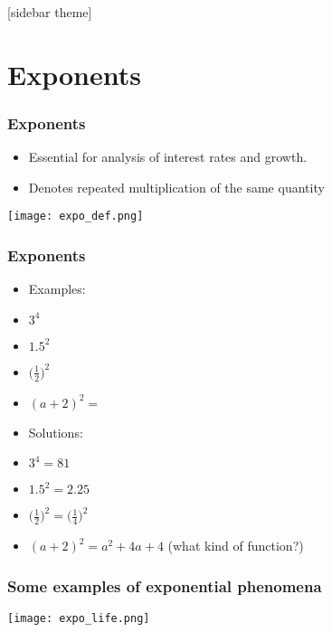 \documentclass[xcolor=dvipsnames, 9pt]{beamer} %
\begin{document}
\begin{frame}
\end{frame}

[sidebar theme]
\section{Exponents}

\begin{frame}
\frametitle{Exponents}
\begin{itemize}
\item Essential for analysis of interest rates and growth. 
\item Denotes repeated multiplication of the same quantity 
\end{itemize}
\begin{center}
\texttt{[image: expo\_def.png]}
\end{center}
\end{frame}

\begin{frame}
\frametitle{Exponents}
\begin{itemize}
\item[] Examples:
\item $3^4$
\item $1.5^2$
\item $\big( \frac{1}{2} \big)^2 $
\item $(a + 2)^2 = $
\item[] Solutions:
\item $3^4 = 81$
\item $1.5^2 = 2.25$
\item $\big( \frac{1}{2} \big)^2 = \big( \frac{1}{4} \big)^2 $
\item $(a + 2)^2 = a^2 + 4a + 4 $ (what kind of function?)
\end{itemize}
\end{frame}

\begin{frame}
\frametitle{Some examples of exponential phenomena}
\begin{center}
\texttt{[image: expo\_life.png]}
\end{center}
\end{frame}
\end{document}
